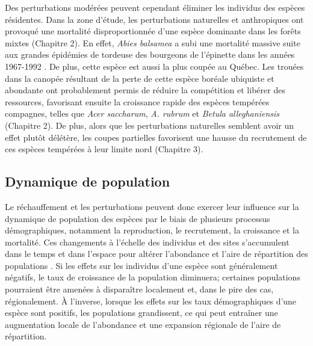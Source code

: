 Des perturbations modérées peuvent cependant éliminer les individus des
espèces résidentes. Dans la zone d'étude, les perturbations naturelles
et anthropiques ont provoqué une mortalité disproportionnée d'une espèce
dominante dans les forêts mixtes (Chapitre 2). En effet, \emph{Abies
balsamea} a subi une mortalité massive suite aux grandes épidémies de
tordeuse des bourgeons de l'épinette dans les années 1967-1992
\citep{duchesne_population_2008}. De plus, cette espèce est aussi la
plus coupée au Québec. Les trouées dans la canopée résultant de la perte
de cette espèce boréale ubiquiste et abondante ont probablement permis
de réduire la compétition et libérer des ressources, favorisant ensuite
la croissance rapide des espèces tempérées compagnes, telles que
\emph{Acer saccharum}, \emph{A. rubrum} et \emph{Betula alleghaniensis}
(Chapitre 2). De plus, alors que les perturbations naturelles semblent
avoir un effet plutôt délétère, les coupes partielles favorisent une
hausse du recrutement de ces espèces tempérées à leur limite nord
(Chapitre 3).

\hypertarget{dynamique-de-population}{%
\subsection{Dynamique de population}\label{dynamique-de-population}}

Le réchauffement et les perturbations peuvent donc exercer leur
influence sur la dynamique de population des espèces par le biais de
plusieurs processus démographiques, notamment la reproduction, le
recrutement, la croissance et la mortalité. Ces changements à l'échelle
des individus et des sites s'accumulent dans le temps et dans l'espace
pour altérer l'abondance et l'aire de répartition des populations
\citep{holt_theoretical_2005}. Si les effets sur les individus d'une
espèce sont généralement négatifs, le taux de croissance de la
population diminuera; certaines populations pourraient être amenées à
disparaître localement et, dans le pire des cas, régionalement. À
l'inverse, lorsque les effets sur les taux démographiques d'une espèce
sont positifs, les populations grandissent, ce qui peut entraîner une
augmentation locale de l'abondance et une expansion régionale de l'aire
de répartition.

